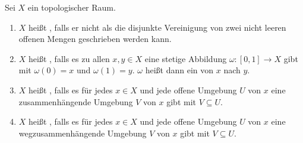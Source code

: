 \begin{definition}[{name=[zusammenhängend und wegzusammenhängend]}]
	Sei $X$ ein topologischer Raum.
	\begin{enumerate}[(1)]
		\item $X$ heißt , falls er nicht als die disjunkte Vereinigung von zwei nicht leeren offenen Mengen geschrieben werden kann.
		\item $X$ heißt , falls es zu allen $x,y \in X$ eine stetige Abbildung $\omega : [0,1] \to X$ gibt mit $\omega(0)=x$ und $\omega(1)=y$. 
		$\omega$ heißt dann ein  von $x$ nach $y$.
		\item $X$ heißt , falls es für jedes $x \in X$ und jede offene Umgebung $U$ von $x$ eine zusammenhängende Umgebung $V$ von $x$ gibt mit $V \subseteq U$.
		\item $X$ heißt , falls es für jedes $x \in X$ und jede offene Umgebung $U$ von $x$ eine wegzusammenhängende Umgebung $V$ von $x$ gibt mit $V \subseteq U$.
	\end{enumerate}
\end{definition}

